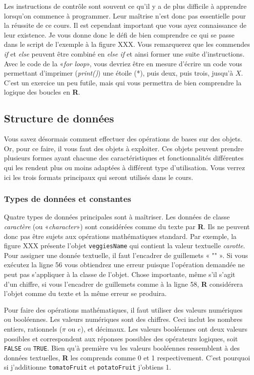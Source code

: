\documentclass[10.5pt,a4paper]{article}
\begin{document}
    Les instructions de contrôle sont souvent ce qu'il y a de plus difficile à apprendre lorsqu'on commence à programmer. Leur maîtrise n'est donc pas essentielle pour la réussite de ce cours. Il est cependant important que vous ayez connaissance de leur existence. Je vous donne donc le défi de bien comprendre ce qui se passe dans le script de l'exemple à la figure XXX. Vous remarquerez que les commendes \emph{if} et \emph{else} peuvent être combiné en \emph{else if} et ainsi former une suite d'instructions. Avec le code de la «\emph{for loop}», vous devriez être en mesure d'écrire un code vous permettant d'imprimer (\emph{print()}) une étoile (*), puis deux, puis trois, jusqu'à $X$. C'est un exercice un peu futile, mais qui vous permettra de bien comprendre la logique des boucles en \textbf{R}. 
  
  \subsection{Structure de données}
  Vous savez désormais comment effectuer des opérations de bases sur des objets. Or, pour ce faire, il vous faut des objets à exploiter. Ces objets peuvent prendre plusieurs formes ayant chacune des caractéristiques et fonctionnalités différentes qui les rendent plus ou moins adaptées à différent type d'utilisation. Vous verrez ici les trois formats principaux qui seront utilisés dans le cours. 
  
    \subsubsection{Types de données et constantes}
    Quatre types de données principales sont à maîtriser. Les données de classe \emph{caractère} (ou «\emph{character}») sont considérées comme du texte par \textbf{R}. Ils ne peuvent donc pas être sujets aux opérations mathématiques standard. Par exemple, la figure XXX présente l'objet \texttt{veggiesName} qui contient la valeur textuelle \emph{carotte}. Pour assigner une donnée textuelle, il faut l'encadrer de guillemets « "" ». Si vous exécutez la ligne 56 vous obtiendrez une erreur puisque l'opération demandée ne peut pas s'appliquer à la classe de l'objet. Chose importante, même s'il s'agit d'un chiffre, si vous l'encadrer de guillemets comme à la ligne 58, \textbf{R} considérera l'objet comme du texte et la même erreur se produira. 
    
    Pour faire des opérations mathématiques, il faut utiliser des valeurs numériques ou booléennes. Les valeurs numériques sont des chiffres. Ceci inclut les nombres entiers, rationnels ($\pi$ ou $e$), et décimaux. Les valeurs booléennes ont deux valeurs possibles et correspondent aux réponses possibles des opérateurs logiques, soit \texttt{FALSE} ou \texttt{TRUE}. Bien qu'à première vu les valeurs booléennes ressemblent à des données textuelles, \textbf{R} les comprends comme 0 et 1 respectivement. C'est pourquoi si j'additionne \texttt{tomatoFruit} et \texttt{potatoFruit} j'obtiens 1.
    
\end{document}
